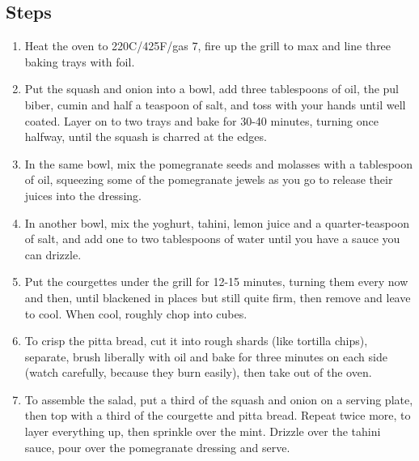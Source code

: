 \documentclass{book}
\begin{document}
\subsection*{Steps}
\begin{enumerate}
\item Heat the oven to 220C/425F/gas 7, fire up the grill to max and line three baking trays with foil.
\item Put the squash and onion into a bowl, add three tablespoons of oil, the pul biber, cumin and half a teaspoon of salt, and toss with your hands until well coated. Layer on to two trays and bake for 30-40 minutes, turning once halfway, until the squash is charred at the edges.
\item In the same bowl, mix the pomegranate seeds and molasses with a tablespoon of oil, squeezing some of the pomegranate jewels as you go to release their juices into the dressing.
\item In another bowl, mix the yoghurt, tahini, lemon juice and a quarter-teaspoon of salt, and add one to two tablespoons of water until you have a sauce you can drizzle.
\item Put the courgettes under the grill for 12-15 minutes, turning them every now and then, until blackened in places but still quite firm, then remove and leave to cool. When cool, roughly chop into cubes.
\item To crisp the pitta bread, cut it into rough shards (like tortilla chips), separate, brush liberally with oil and bake for three minutes on each side (watch carefully, because they burn easily), then take out of the oven.
\item To assemble the salad, put a third of the squash and onion on a serving plate, then top with a third of the courgette and pitta bread. Repeat twice more, to layer everything up, then sprinkle over the mint. Drizzle over the tahini sauce, pour over the pomegranate dressing and serve.
\end{enumerate}
\newpage
\end{document}
